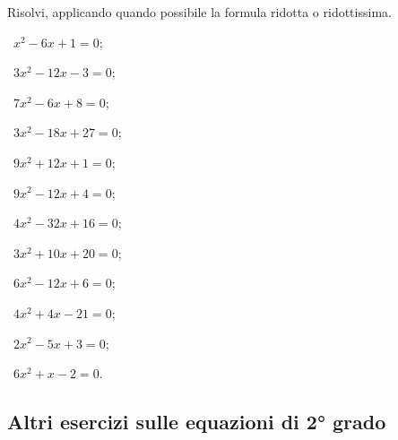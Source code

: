 \begin{esercizio}[\Ast]
\label{ese:3.15}
Risolvi, applicando quando possibile la formula ridotta o ridottissima.
\begin{multicols}{2}
 \begin{enumeratea}
 \item~$x^{2}-6 x + 1 = 0$;
 \item~$3 x^{2}-12 x-3 = 0$;
 \item~$7 x^{2}-6 x + 8 = 0$;
 \item~$3 x^{2}-18 x + 27 = 0$;
 \item~$9 x^{2} + 12 x + 1 = 0$;
 \item~$9 x^{2}-12 x + 4 = 0$;
 \item~$4 x^{2}-32 x + 16 = 0$;
 \item~$3 x^{2} + 10 x + 20 = 0$;
 \item~$6 x^{2} - 12 x + 6 = 0$;
 \item~$4 x^{2} + 4 x - 21 = 0$;
 \item~$2 x^{2} -5 x + 3 = 0$;
 \item~$6 x^{2} + x - 2 = 0$.
 \end{enumeratea}
 \end{multicols}
\end{esercizio}

\subsection*{Altri esercizi sulle equazioni di 2° grado}

